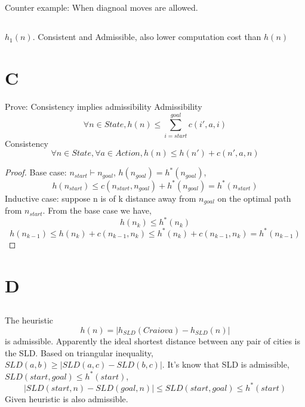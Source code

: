 \documentclass{article}
\begin{document}
\subsection{}
Counter example: When diagnoal moves are allowed.

\subsection{} 
$h_1(n)$. Consistent and Admissible, also lower computation cost than $h(n)$

\section{C}
Prove: Consistency implies admissibility\newline
Admissibility
\begin{equation}
    \forall n \in State, h(n) \leq \sum_{i = start}^{goal}c(i', a, i)
\end{equation}
Consistency
\begin{equation}
    \forall n \in State, \forall a \in Action, h(n) \leq h(n') + c(n', a, n)
\end{equation}
\begin{proof}
    Base case: $n_{start} \vdash n_{goal}$, $h(n_{goal}) = h^*(n_{goal})$, 
    \[h(n_{start}) \leq c(n_{start}, n_{goal}) + h^*(n_{goal}) = h^*(n_{start})\]
    Inductive case: suppose n is of k distance away from $n_{goal}$ on the optimal path from $n_{start}$. From the base case we have, 
    \[h(n_k) \leq h^*(n_k)\]
    \[h(n_{k-1}) \leq h(n_k) + c(n_{k-1}, n_k) \leq h^*(n_k) + c(n_{k-1}, n_k) = h^*(n_{k-1})\]


\end{proof}
\section{D}
\subsection{}
\subsection{}
The heuristic \[h(n) = |h_{SLD}(Craiova) - h_{SLD}(n)|\] is admissible.\newline
Apparently the ideal shortest distance between any pair of cities is the SLD. Based on triangular inequality, 
$SLD(a, b) \geq |SLD(a, c) - SLD(b, c)|$. 
It's know that SLD is admissible, $SLD(start, goal) \leq h^*(start)$, 
\[|SLD(start, n) - SLD(goal, n)| \leq SLD(start, goal) \leq h^*(start)\]
Given heuristic is also admissible.


\end{document}
